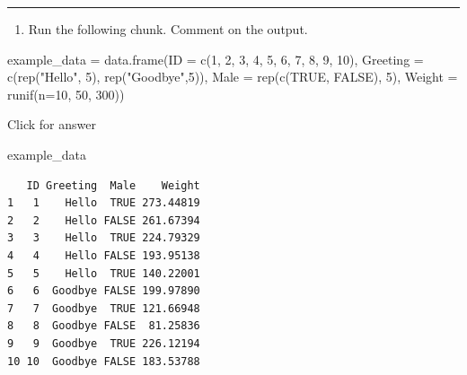 \documentclass[
]{book}
\newenvironment{Shaded}{\begin{snugshade}}{\end{snugshade}}
\newcommand{\AttributeTok}[1]{\textcolor[rgb]{0.77,0.63,0.00}{#1}}
\newcommand{\ConstantTok}[1]{\textcolor[rgb]{0.00,0.00,0.00}{#1}}
\newcommand{\DecValTok}[1]{\textcolor[rgb]{0.00,0.00,0.81}{#1}}
\newcommand{\FunctionTok}[1]{\textcolor[rgb]{0.00,0.00,0.00}{#1}}
\newcommand{\NormalTok}[1]{#1}
\newcommand{\OtherTok}[1]{\textcolor[rgb]{0.56,0.35,0.01}{#1}}
\newcommand{\StringTok}[1]{\textcolor[rgb]{0.31,0.60,0.02}{#1}}
\providecommand{\tightlist}{%
  \setlength{\itemsep}{0pt}\setlength{\parskip}{0pt}}
\begin{document}
\begin{center}\rule{0.5\linewidth}{0.5pt}\end{center}

\begin{enumerate}
\def\labelenumi{\alph{enumi}.}
\tightlist
\item
  Run the following chunk. Comment on the output.
\end{enumerate}

\begin{Shaded}
\begin{Highlighting}[]
\NormalTok{example\_data }\OtherTok{=} \FunctionTok{data.frame}\NormalTok{(}\AttributeTok{ID =} \FunctionTok{c}\NormalTok{(}\DecValTok{1}\NormalTok{, }\DecValTok{2}\NormalTok{, }\DecValTok{3}\NormalTok{, }\DecValTok{4}\NormalTok{, }\DecValTok{5}\NormalTok{, }\DecValTok{6}\NormalTok{, }\DecValTok{7}\NormalTok{, }\DecValTok{8}\NormalTok{, }\DecValTok{9}\NormalTok{, }\DecValTok{10}\NormalTok{),}
                          \AttributeTok{Greeting =} \FunctionTok{c}\NormalTok{(}\FunctionTok{rep}\NormalTok{(}\StringTok{"Hello"}\NormalTok{, }\DecValTok{5}\NormalTok{), }\FunctionTok{rep}\NormalTok{(}\StringTok{"Goodbye"}\NormalTok{,}\DecValTok{5}\NormalTok{)),}
                          \AttributeTok{Male =} \FunctionTok{rep}\NormalTok{(}\FunctionTok{c}\NormalTok{(}\ConstantTok{TRUE}\NormalTok{, }\ConstantTok{FALSE}\NormalTok{), }\DecValTok{5}\NormalTok{),}
                          \AttributeTok{Weight =} \FunctionTok{runif}\NormalTok{(}\AttributeTok{n=}\DecValTok{10}\NormalTok{, }\DecValTok{50}\NormalTok{, }\DecValTok{300}\NormalTok{))}
\end{Highlighting}
\end{Shaded}

Click for answer

\begin{Shaded}
\begin{Highlighting}[]
\NormalTok{example\_data}
\end{Highlighting}
\end{Shaded}

\begin{verbatim}
   ID Greeting  Male    Weight
1   1    Hello  TRUE 273.44819
2   2    Hello FALSE 261.67394
3   3    Hello  TRUE 224.79329
4   4    Hello FALSE 193.95138
5   5    Hello  TRUE 140.22001
6   6  Goodbye FALSE 199.97890
7   7  Goodbye  TRUE 121.66948
8   8  Goodbye FALSE  81.25836
9   9  Goodbye  TRUE 226.12194
10 10  Goodbye FALSE 183.53788
\end{verbatim}
\end{document}
